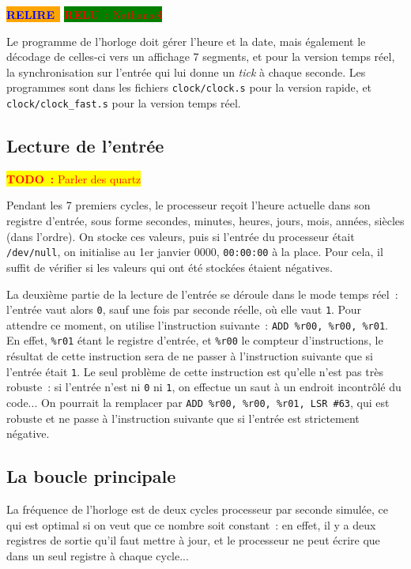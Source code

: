 \documentclass[11pt,a4paper]{article}
\newcommand{\todo}[1]{\colorbox{yellow}{\textcolor{red}{\textbf{TODO~:} #1}}}
\newcommand{\relire}{\colorbox{orange}{\textcolor{blue}{\textbf{RELIRE}~}}}
\newcommand{\relu}[1]{\colorbox{green}{\textcolor{red}{\textbf{RELU~:} #1}}}
\begin{document}
\relire
\relu{Nathanaël}

Le programme de l'horloge doit gérer l'heure et la date, mais
également le décodage de celles-ci vers un affichage 7 segments, et
pour la version temps réel, la synchronisation sur l'entrée qui lui
donne un \textit{tick} à chaque seconde. Les programmes sont dans les
fichiers \verb!clock/clock.s! pour la version rapide, et
\verb!clock/clock_fast.s! pour la version temps réel.

\subsection{Lecture de l'entrée}

\todo{Parler des quartz}

Pendant les 7 premiers cycles, le processeur reçoit l'heure actuelle
dans son registre d'entrée, sous forme secondes, minutes, heures,
jours, mois, années, siècles (dans l'ordre). On stocke ces valeurs,
puis si l'entrée du processeur était \verb!/dev/null!, on initialise au
1er janvier 0000, \verb!00:00:00! à la place. Pour cela, il suffit de
vérifier si les valeurs qui ont été stockées étaient négatives.

La deuxième partie de la lecture de l'entrée se déroule dans le mode
temps réel~: l'entrée vaut alors \verb!0!, sauf une fois par seconde
réelle, où elle vaut \verb!1!. Pour attendre ce moment, on utilise
l'instruction suivante~: \verb!ADD %r00, %r00, %r01!. En effet,
\verb!%r01! étant le registre d'entrée, et \verb!%r00! le compteur
d'instructions, le résultat de cette instruction sera de ne passer à
l'instruction suivante que si l'entrée était \verb!1!. Le seul
problème de cette instruction est qu'elle n'est pas très robuste~: si
l'entrée n'est ni \verb!0! ni \verb!1!, on effectue un saut à un
endroit incontrôlé du code... On pourrait la remplacer par
\verb!ADD %r00, %r00, %r01, LSR #63!, qui est robuste et ne passe à
l'instruction suivante que si l'entrée est strictement négative.

\subsection{La boucle principale}

La fréquence de l'horloge est de deux cycles processeur par seconde
simulée, ce qui est optimal si on veut que ce nombre soit constant~:
en effet, il y a deux registres de sortie qu'il faut mettre à jour, et
le processeur ne peut écrire que dans un seul registre à chaque cycle...
\end{document}
